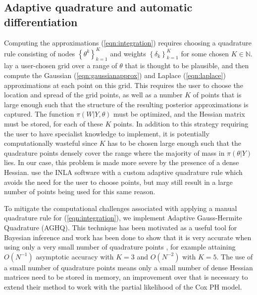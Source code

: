 \documentclass[ba]{imsart}
\begin{document}
\subsection{Adaptive quadrature and automatic differentiation}


Computing the approximations (\ref{eqn:integration}) requires choosing a quadrature rule consisting of nodes $\left\{\theta^{k}\right\}_{k=1}^{K}$ and weights $\left\{\delta_{k}\right\}_{k=1}^{K}$ for some chosen $K\in\mathbb{N}$. \cite{casecross} lay a user-chosen grid over a range of $\theta$ that is thought to be plausible, and then compute the Gaussian (\ref{eqn:gaussianapprox}) and Laplace (\ref{eqn:laplace}) approximations at each point on this grid. This requires the user to choose the location and spread of the grid points, as well as a number $K$
of points that is large enough such that the structure of the resulting posterior approximations is captured. The function $\pi(W|Y,\theta)$ must be optimized, and the Hessian matrix must be stored, for each of these $K$ points. In addition to this strategy requiring the user to have specialist knowledge to implement, it is potentially computationally wasteful since $K$ has to be chosen large enough such that the quadrature points densely cover the range where the majority of mass in $\pi(\theta|Y)$ lies. In our case, this problem is made more severe by the presence of a dense Hessian. \cite{inlacoxph} use the INLA software with a custom adaptive quadrature rule which avoids the need for the user to choose points, but may still result in a large number of points being used for this same reason.


To mitigate the computational challenges associated with applying a manual quadrature rule for (\ref{eqn:integration}), we implement Adaptive Gauss-Hermite Quadrature (AGHQ). This technique has been motivated as a useful tool for Bayesian inference \citep{nayloradaptive} and work has been done to show that it is very accurate when using only a very small number of quadrature points \citep{adaptive_GH_1994,adaptive_GH_2020}, for example attaining $O(N^{-1})$ asymptotic accuracy with $K = 3$ and $O(N^{-2})$ with $K = 5$. The use of a small number of quadrature points means only a small number of dense Hessian matrices need to be stored in memory, an improvement over \cite{casecross} that is necessary to extend their method to work with the partial likelihood of the Cox PH model.
\end{document}
